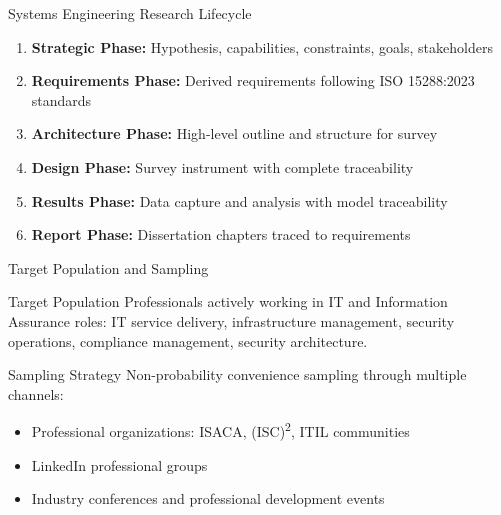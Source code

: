 \documentclass{beamer}
\begin{document}
\begin{frame}[allowframebreaks]{Systems Engineering Research Lifecycle}
  \begin{enumerate}
    \item \textbf{Strategic Phase:} Hypothesis, capabilities, constraints, goals, stakeholders
    \item \textbf{Requirements Phase:} Derived requirements following ISO 15288:2023 standards
    \item \textbf{Architecture Phase:} High-level outline and structure for survey
    \item \textbf{Design Phase:} Survey instrument with complete traceability
    \item \textbf{Results Phase:} Data capture and analysis with model traceability
    \item \textbf{Report Phase:} Dissertation chapters traced to requirements
  \end{enumerate}
\end{frame}

\begin{frame}[allowframebreaks]{Target Population and Sampling}
  \begin{block}{Target Population}
    Professionals actively working in IT and Information Assurance roles: IT service delivery, infrastructure management, security operations, compliance management, security architecture.
  \end{block}

  \begin{block}{Sampling Strategy}
    Non-probability convenience sampling through multiple channels:
    \begin{itemize}
      \item Professional organizations: ISACA, (ISC)\textsuperscript{2}, ITIL communities
      \item LinkedIn professional groups
      \item Industry conferences and professional development events
    \end{itemize}
  \end{block}
\end{frame}
\end{document}
